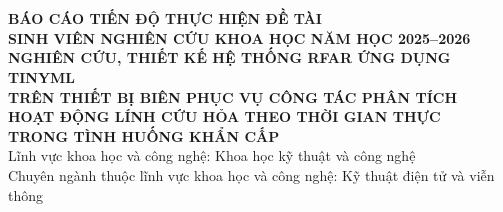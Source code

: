 \documentclass[a4paper]{article}
\begin{document}

\thispagestyle{empty}
\begin{center}
    \fontsize{13pt}{15pt}\\
    \vspace{-0.2cm}
    \\
    \vspace{3.2cm}
    \textbf{BÁO CÁO TIẾN ĐỘ THỰC HIỆN ĐỀ TÀI}\\
    \vspace{1.5cm}
    \textbf{SINH VIÊN NGHIÊN CỨU KHOA HỌC NĂM HỌC 2025--2026}\\
    \vspace{3.0cm}
    \textbf{NGHIÊN CỨU, THIẾT KẾ HỆ THỐNG RFAR ỨNG DỤNG TINYML}\\
    \textbf{TRÊN THIẾT BỊ BIÊN PHỤC VỤ CÔNG TÁC PHÂN TÍCH}\\
    \textbf{HOẠT ĐỘNG LÍNH CỨU HỎA THEO THỜI GIAN THỰC}\\
    \textbf{TRONG TÌNH HUỐNG KHẨN CẤP}\\
    \vspace{3.0cm}
    Lĩnh vực khoa học và công nghệ: Khoa học kỹ thuật và công nghệ\\
    Chuyên ngành thuộc lĩnh vực khoa học và công nghệ: Kỹ thuật điện tử và viễn thông
\end{center}

\pagebreak
\end{document}
